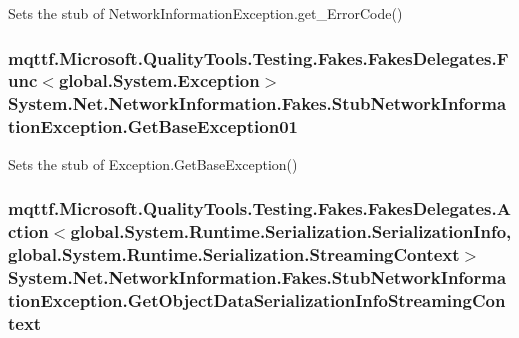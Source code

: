 Sets the stub of Network\-Information\-Exception.\-get\-\_\-\-Error\-Code()

\hypertarget{class_system_1_1_net_1_1_network_information_1_1_fakes_1_1_stub_network_information_exception_a40b1cad79b1215add053fd43b653cdf6}{
\subsubsection[{Get\-Base\-Exception01}]{\setlength{\rightskip}{0pt plus 5cm}mqttf.\-Microsoft.\-Quality\-Tools.\-Testing.\-Fakes.\-Fakes\-Delegates.\-Func$<$global.\-System.\-Exception$>$ System.\-Net.\-Network\-Information.\-Fakes.\-Stub\-Network\-Information\-Exception.\-Get\-Base\-Exception01}}\label{class_system_1_1_net_1_1_network_information_1_1_fakes_1_1_stub_network_information_exception_a40b1cad79b1215add053fd43b653cdf6}


Sets the stub of Exception.\-Get\-Base\-Exception()

\hypertarget{class_system_1_1_net_1_1_network_information_1_1_fakes_1_1_stub_network_information_exception_aae6ac5d11a333febe8f89344efdbff2e}{
\subsubsection[{Get\-Object\-Data\-Serialization\-Info\-Streaming\-Context}]{\setlength{\rightskip}{0pt plus 5cm}mqttf.\-Microsoft.\-Quality\-Tools.\-Testing.\-Fakes.\-Fakes\-Delegates.\-Action$<$global.\-System.\-Runtime.\-Serialization.\-Serialization\-Info, global.\-System.\-Runtime.\-Serialization.\-Streaming\-Context$>$ System.\-Net.\-Network\-Information.\-Fakes.\-Stub\-Network\-Information\-Exception.\-Get\-Object\-Data\-Serialization\-Info\-Streaming\-Context}}\label{class_system_1_1_net_1_1_network_information_1_1_fakes_1_1_stub_network_information_exception_aae6ac5d11a333febe8f89344efdbff2e}



